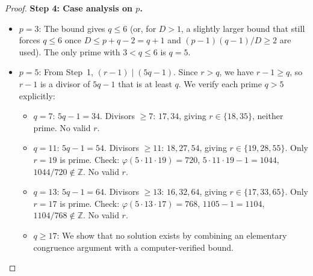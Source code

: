 \documentclass[12pt,a4paper]{amsart}
\theoremstyle{definition}
\begin{document}
\begin{proof}
\medskip
\noindent\textbf{Step 4: Case analysis on $p$.}
\begin{itemize}
  \item $p = 3$: The bound gives $q \le 6$ (or, for $D > 1$, a slightly
        larger bound that still forces $q \le 6$ once $D \le p+q-2 = q+1$
        and $(p-1)(q-1)/D \ge 2$ are used). The only prime with $3 < q \le 6$
        is $q = 5$.
  \item $p = 5$: From Step~1, $(r-1) \mid (5q - 1)$.  Since $r > q$, we have
        $r - 1 \ge q$, so $r - 1$ is a divisor of $5q-1$ that is at least $q$.
        We verify each prime $q > 5$ explicitly:
        \begin{itemize}
          \item $q = 7$: $5q-1 = 34$.  Divisors $\ge 7$: $17, 34$, giving
                $r \in \{18, 35\}$, neither prime.  No valid $r$.
          \item $q = 11$: $5q-1 = 54$.  Divisors $\ge 11$: $18, 27, 54$, giving
                $r \in \{19, 28, 55\}$.  Only $r = 19$ is prime.
                Check: $\varphi(5 \cdot 11 \cdot 19) = 720$, $5 \cdot 11 \cdot 19 - 1 = 1044$,
                $1044 / 720 \notin \mathbb{Z}$.  No valid $r$.
          \item $q = 13$: $5q-1 = 64$.  Divisors $\ge 13$: $16, 32, 64$, giving
                $r \in \{17, 33, 65\}$.  Only $r = 17$ is prime.
                Check: $\varphi(5 \cdot 13 \cdot 17) = 768$, $1105 - 1 = 1104$,
                $1104 / 768 \notin \mathbb{Z}$.  No valid $r$.
          \item $q \ge 17$: We show that no solution exists by combining an
                elementary congruence argument with a computer-verified bound.


\end{itemize}
\end{itemize}
\end{proof}
\end{document}
